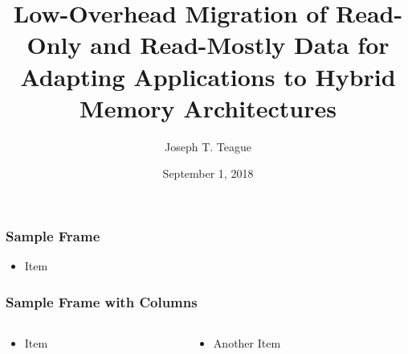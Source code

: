 \documentclass{beamer}   %
\author[authors]{Joseph T. Teague}
\institute[utk]{\normalsize Title}
\date{September 1, 2018}
\begin{document}
\title{Low-Overhead Migration of Read-Only and Read-Mostly Data for Adapting Applications to Hybrid Memory Architectures\vspace{1\baselineskip}}
\frame{\titlepage}


\begin{frame}[t]
    \frametitle{Sample Frame}
    \begin{itemize}
        \item Item
    \end{itemize}
\end{frame}


\begin{frame}[t]
    \frametitle{Sample Frame with Columns}
    \begin{columns}[t]
        \begin{column}{0.5\linewidth}
            \begin{itemize}
                \item Item
            \end{itemize}
        \end{column}
        \begin{column}{0.5\linewidth}
            \begin{itemize}
                \item Another Item
            \end{itemize}
        \end{column}
    \end{columns}
\end{frame}

\end{document}
